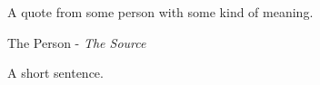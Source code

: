 \thispagestyle{empty}

\vspace*{\fill}

\setlength{}

\epigraph{A quote from some person with some kind of meaning.}{The Person - \textit{The Source}}

\vspace*{2cm}

\setlength{}
\setlength{\epigraphrule}{0pt}
\epigraph{\centering A short sentence.}{}


\vspace*{\fill}